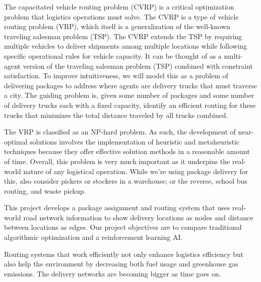 \documentclass[conference]{IEEEtran}
\begin{document}

The capacitated vehicle routing problem (CVRP) is a critical optimization problem that logistics operations must solve. The CVRP is a type of vehicle routing problem (VRP), which itself is a generalization of the well-known traveling salesman problem (TSP). The CVRP extends the TSP by requiring multiple vehicles to deliver shipments among multiple locations while following specific operational rules for vehicle capacity. It can be thought of as a multi-agent version of the traveling salesman problem (TSP) combined with constraint satisfaction. To improve intuitiveness, we will model this as a problem of delivering packages to address where agents are delivery trucks that must traverse a city. The guiding problem is, given some number of packages and some number of delivery trucks each with a fixed capacity, identify an efficient routing for these trucks that minimizes the total distance traveled by all trucks combined.

The VRP is classified as an NP-hard problem. As such, the development of near-optimal solutions involves the implementation of heuristic and metaheuristic techniques because they offer effective solution methods in a reasonable amount of time. Overall, this problem is very much important as it underpins the real-world nature of any logistical operation. While we're using package delivery for this, also consider pickers or stockers in a warehouse; or the reverse, school bus routing, and waste pickup.

This project develops a package assignment and routing system that uses real-world road network information to show delivery locations as nodes and distance between locations as edges. Our project objectives are to compare traditional algorithmic optimization and a reinforcement learning AI.

Routing systems that work efficiently not only enhance logistics efficiency but also help the environment by decreasing both fuel usage and greenhouse gas emissions. The delivery networks are becoming bigger as time goes on.
\end{document}
